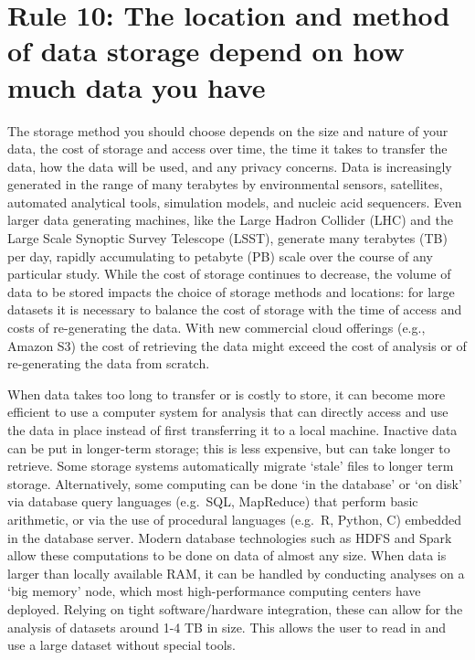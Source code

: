\documentclass[10pt,letterpaper]{article}
\begin{document}
\section*{Rule 10: The location and method of data storage depend on how
much data you
have}\label{rule-10-the-location-and-method-of-data-storage-depend-on-how-much-data-you-have}

The storage method you should choose depends on the size and nature of
your data, the cost of storage and access over time, the time it takes
to transfer the data, how the data will be used, and any privacy
concerns. Data is increasingly generated in the range of many terabytes
by environmental sensors, satellites, automated analytical tools,
simulation models, and nucleic acid sequencers. Even larger data
generating machines, like the Large Hadron Collider (LHC) and the Large
Scale Synoptic Survey Telescope (LSST), generate many terabytes (TB) per
day, rapidly accumulating to petabyte (PB) scale over the course of any
particular study. While the cost of storage continues to decrease, the
volume of data to be stored impacts the choice of storage methods and
locations: for large datasets it is necessary to balance the cost of
storage with the time of access and costs of re-generating the data.
With new commercial cloud offerings (e.g., Amazon S3) the cost of
retrieving the data might exceed the cost of analysis or of
re-generating the data from scratch.

When data takes too long to transfer or is costly to store, it can
become more efficient to use a computer system for analysis that can
directly access and use the data in place instead of first transferring
it to a local machine. Inactive data can be put in longer-term storage;
this is less expensive, but can take longer to retrieve. Some storage
systems automatically migrate `stale' files to longer term storage.
Alternatively, some computing can be done `in the database' or `on disk'
via database query languages (e.g.~SQL, MapReduce) that perform basic
arithmetic, or via the use of procedural languages (e.g.~R, Python, C)
embedded in the database server. Modern database technologies such as
HDFS and Spark allow these computations to be done on data of almost any
size. When data is larger than locally available RAM, it can be handled
by conducting analyses on a `big memory' node, which most
high-performance computing centers have deployed. Relying on tight
software/hardware integration, these can allow for the analysis of
datasets around 1-4 TB in size. This allows the user to read in and use
a large dataset without special tools.
\end{document}
